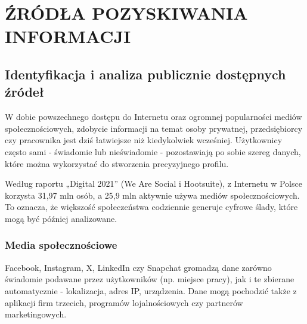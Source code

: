 \chapter{ŹRÓDŁA POZYSKIWANIA INFORMACJI}
\enlargethispage{20pt}

\section{Identyfikacja i analiza publicznie dostępnych źródeł}

W dobie powszechnego dostępu do Internetu oraz ogromnej popularności mediów społecznościowych, zdobycie informacji na temat osoby prywatnej, przedsiębiorcy czy pracownika jest dziś łatwiejsze niż kiedykolwiek wcześniej. Użytkownicy często sami - świadomie lub nieświadomie - pozostawiają po sobie szereg danych, które można wykorzystać do stworzenia precyzyjnego profilu.

Według raportu „Digital 2021” (We Are Social i Hootsuite), z Internetu w Polsce korzysta 31,97 mln osób, a 25,9 mln aktywnie używa mediów społecznościowych. To oznacza, że większość społeczeństwa codziennie generuje cyfrowe ślady, które mogą być później analizowane.\cite{zrodlo}

\subsection{Media społecznościowe}

Facebook, Instagram, X, LinkedIn czy Snapchat gromadzą dane zarówno świadomie podawane przez użytkowników (np. miejsce pracy), jak i te zbierane automatycznie - lokalizacja, adres IP, urządzenia.
Dane mogą pochodzić także z aplikacji firm trzecich, programów lojalnościowych czy partnerów marketingowych.\cite{zrodlo2}

